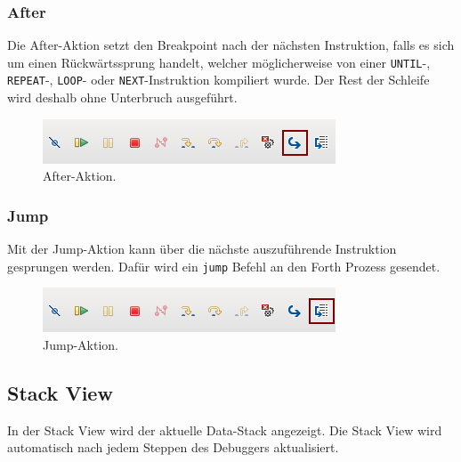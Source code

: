 \subsubsection{After}

Die After-Aktion setzt den Breakpoint nach der nächsten Instruktion, falls es sich um einen Rückwärtssprung handelt, welcher möglicherweise von einer 
\verb!UNTIL!-, \verb!REPEAT!-, \verb!LOOP!- oder \verb!NEXT!-Instruktion kompiliert wurde. Der Rest der Schleife wird deshalb ohne Unterbruch ausgeführt.

\begin{figure}[H]
	\centering
		\includegraphics[scale=1]{debugger/after.png}
		\caption{After-Aktion.}
		\label{fig:after}
\end{figure}

\subsubsection{Jump}

Mit der Jump-Aktion kann über die nächste auszuführende Instruktion gesprungen werden. Dafür wird ein \verb!jump! Befehl an den Forth Prozess gesendet.

\begin{figure}[H]
	\centering
		\includegraphics[scale=1]{debugger/jump.png}
		\caption{Jump-Aktion.}
		\label{fig:jump}
\end{figure}

\newpage

\subsection{Stack View}

In der Stack View wird der aktuelle Data-Stack angezeigt. Die Stack View wird automatisch nach jedem Steppen des Debuggers aktualisiert.

